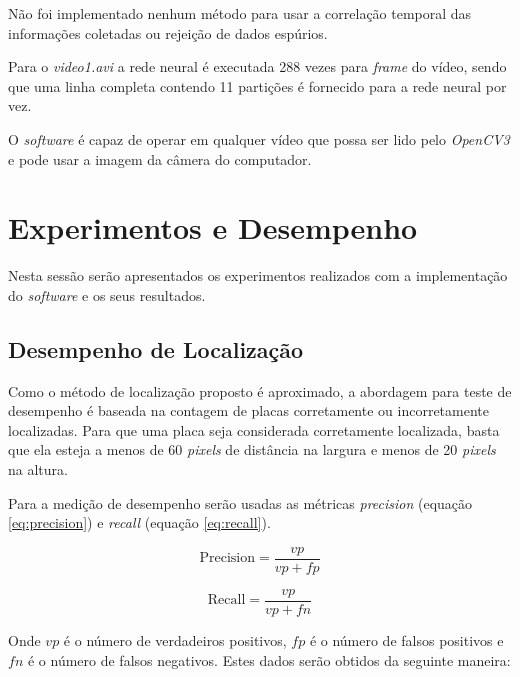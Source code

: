 Não foi implementado nenhum método para usar a correlação temporal das
informações coletadas ou rejeição de dados espúrios.

Para o \emph{video1.avi} a rede neural é executada 288 vezes para \emph{frame}
do vídeo, sendo que uma linha completa contendo 11 partições é fornecido para a
rede neural por vez.

O \emph{software} é capaz de operar em qualquer vídeo que possa ser lido pelo
\emph{OpenCV3} e pode usar a imagem da câmera do computador.

\section{Experimentos e Desempenho}

Nesta sessão serão apresentados os experimentos realizados com a implementação
do \emph{software} e os seus resultados.

\subsection{Desempenho de Localização} \label{sec:desemp_loc}

Como o método de localização proposto é aproximado, a abordagem para teste de
desempenho é baseada na contagem de placas corretamente ou
incorretamente localizadas. Para que uma placa seja considerada corretamente
localizada, basta que ela esteja a menos de 60 \emph{pixels} de distância na
largura e menos de 20 \emph{pixels} na altura.
	
Para a medição de desempenho serão usadas as métricas \emph{precision}
(equação \ref{eq:precision}) e \emph{recall} (equação \ref{eq:recall}).

\noindent\begin{minipage}{.5\linewidth}
	\begin{equation} \label{eq:precision}
		\text{Precision} = \frac{vp}{vp + fp}
	\end{equation}
\end{minipage}
\begin{minipage}{.5\linewidth}
	\begin{equation} \label{eq:recall}
		\text{Recall} = \frac{vp}{vp + fn}
	\end{equation}
\end{minipage}

Onde $vp$ é o número de verdadeiros positivos, $fp$ é o número de falsos
positivos e $fn$ é o número de falsos negativos. Estes dados serão obtidos da
seguinte maneira:

